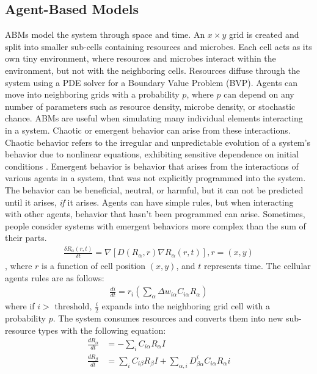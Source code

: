 \subsection{Agent-Based Models}
ABMs model the system through space and time.
An $x \times y$ grid is created and split into smaller sub-cells containing resources and microbes.
Each cell acts as its own tiny environment, where resources and microbes interact within the environment, but not with the neighboring cells.
Resources diffuse through the system using a PDE solver for a Boundary Value Problem (BVP).
Agents can move into neighboring grids with a probability $p$, where $p$ can depend on any number of parameters such as resource density, microbe density, or stochastic chance. \newline 
ABMs are useful when simulating many individual elements interacting in a system.
Chaotic or emergent behavior can arise from these interactions.
Chaotic behavior refers to the irregular and unpredictable evolution of a system's behavior due to nonlinear equations, exhibiting sensitive dependence on initial conditions \cite{encyclopedia_of_physical_science_and_technology}. \newline 
Emergent behavior is behavior that arises from the interactions of various agents in a system, that was not explicitly programmed into the system.
The behavior can be beneficial, neutral, or harmful, but it can not be predicted until it arises, \textit{if} it arises.
Agents can have simple rules, but when interacting with other agents, behavior that hasn't been programmed can arise.
Sometimes, people consider systems with emergent behaviors more complex than the sum of their parts. \newline
\begin{align} 
    \frac{\delta R_\alpha(r, t)}{\delta t} = \nabla \left[D \left( R_\alpha, r\right) \nabla R_\alpha \left( r, t \right) \right], r = \left(x, y\right)
\end{align}, where $r$ is a function of cell position $(x, y)$, and $t$ represents time. 
The cellular agents rules are as follows: 
\begin{align} 
    \frac{di}{dt} = r_i \left( \sum_\alpha \Delta w_{i\alpha}C_{i\alpha}R_\alpha\right)
\end{align} where if $i> \text{ threshold, }\frac{i}{2}$ expands into the neighboring grid cell with a probability $p$. 
The system consumes resources and converts them into new sub-resource types with the following equation:
\begin{align} 
    \frac{dR_\alpha}{dt} &= -\sum_i C_{i\alpha}R_\alpha I \\
    \frac{dR_\beta}{dt} &= \sum_i C_{i\beta}R_\beta I + \sum_{\alpha, i}D_{\beta \alpha}^{i} C_{i \alpha} R_\alpha i
\end{align}

